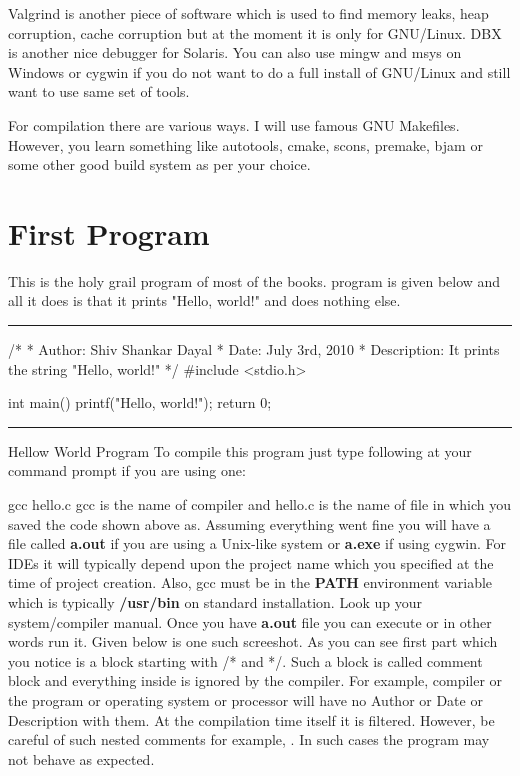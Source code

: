 Valgrind is another piece of software which is used to find memory leaks, heap
corruption, cache corruption but at the moment it is only for GNU/Linux. DBX is
another nice debugger for Solaris. You can also use mingw and msys on Windows or
cygwin if you do not want to do a full install of GNU/Linux and still want to
use same set of tools.

For compilation there are various ways. I will use famous GNU Makefiles. 
However, you learn something like autotools, cmake, scons, premake, bjam or some
other good build system as per your choice.

\section{First Program}
This is the holy grail program of most of the books. 
program is given below and all it does is that it prints "Hello, world!" and does
nothing else.
\blank[force,1mm]\hrule\blank[force,1mm]
\startCPP
/*
 * Author: Shiv Shankar Dayal
 * Date: July 3rd, 2010
 * Description: It prints the string "Hello, world!"
 */
#include <stdio.h>

int main()
{
  printf("Hello, world!\n");
  return 0;
}
\stopCPP
{}
\hrule
\blank[force,1mm]
\startalignment[middle]
Hellow World Program
\stopalignment
To compile this program just type following at your command prompt if you are using
one:

\starttyping
gcc hello.c
\stoptyping
gcc is the name of compiler and hello.c is the name of file in which you saved the 
code shown above as. Assuming everything went fine you will have a file called
{\bf a.out} if you are using a Unix-like system or {\bf a.exe} if using cygwin. For 
IDEs it will typically depend upon the project name which you specified at the time 
of project creation. Also, gcc must be in the {\bf PATH} environment variable which 
is typically {\bf /usr/bin} on standard installation. Look up your system/compiler 
manual. Once you have {\bf a.out} file you can execute or in other words run it.
Given below is one such screeshot.\hfil\break
\blank[force, 1mm]
As you can see first part which you notice is a block starting with /* and */. Such
a block is called comment block and everything inside is ignored by the compiler.
For example, compiler or the program or operating system or processor will have
no Author or Date or Description with them. At the compilation time itself it is
filtered. However, be careful of such nested comments for example, . In such cases the program may not behave
as expected.

